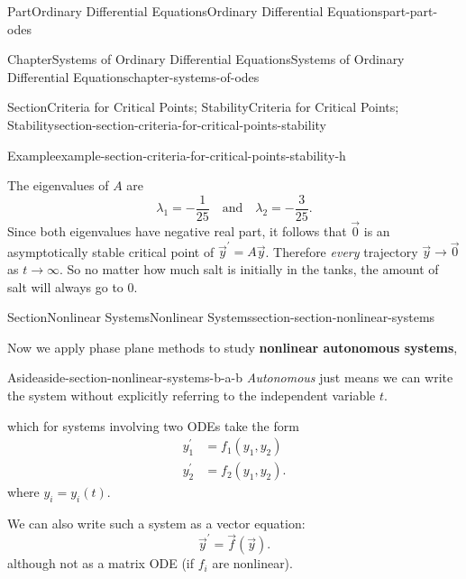 \documentclass[twoside,10pt,]{book}
\newcommand{\terminology}[1]{\textbf{#1}}
\numberwithin{equation}{part}
\begin{document}
\begin{partptx}{Part}{Ordinary Differential Equations}{}{Ordinary Differential Equations}{}{}{part-part-odes}
\begin{chapterptx}{Chapter}{Systems of Ordinary Differential Equations}{}{Systems of Ordinary Differential Equations}{}{}{chapter-systems-of-odes}
\begin{sectionptx}{Section}{Criteria for Critical Points; Stability}{}{Criteria for Critical Points; Stability}{}{}{section-section-criteria-for-critical-points-stability}
\begin{example}{Example}{}{example-section-criteria-for-critical-points-stability-h}
\begin{equation*}
\end{equation*}
%
\par
The eigenvalues of \(A\) are%
\begin{equation*}
\lambda_{1} = -\frac{1}{25}\quad\text{and}\quad\lambda_{2} = -\frac{3}{25}.
\end{equation*}
Since both eigenvalues have negative real part, it follows that \(\vec{0}\) is an asymptotically stable critical point of \(\vec{y}^\prime=A\vec{y}\). Therefore \emph{every} trajectory \(\vec{y}\to\vec{0}\) as \(t\to\infty\). So no matter how much salt is initially in the tanks, the amount of salt will always go to \(0\).%
\end{example}
\end{sectionptx}
%
%
\typeout{************************************************}
\typeout{************************************************}
%
\begin{sectionptx}{Section}{Nonlinear Systems}{}{Nonlinear Systems}{}{}{section-section-nonlinear-systems}
\begin{introduction}{}%
Now we apply phase plane methods to study \terminology{nonlinear autonomous systems}, \begin{aside}{Aside}{}{aside-section-nonlinear-systems-b-a-b}%
\emph{Autonomous} just means we can write the system without explicitly referring to the independent variable \(t\).%
\end{aside}
 which for systems involving two ODEs take the form%
\begin{align*}
y^\prime_{1} & = f_{1}(y_{1},y_{2})\\
y^\prime_{2} & = f_{2}(y_{1},y_{2})\text{.}
\end{align*}
where \(y_{i} = y_{i}(t)\).%
\par
We can also write such a system as a vector equation:%
\begin{equation}
\vec{y}^\prime = \vec{f}(\vec{y})\text{.}\label{men-equation-nonlinear-system}
\end{equation}
although not as a matrix ODE (if \(f_{i}\) are nonlinear).%
\par

\end{introduction}
\end{sectionptx}
\end{chapterptx}
\end{partptx}
\end{document}
